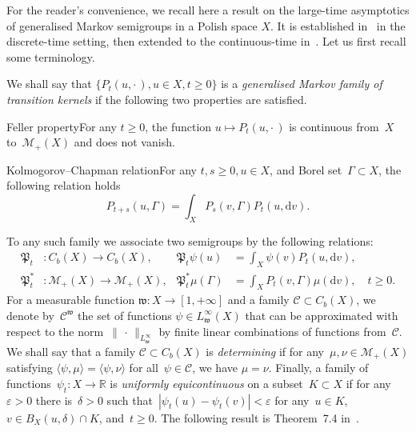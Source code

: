 \documentclass[AHL,Unicode,longabstracts]{cedram}
\newcommand{\R}{{\mathbb R}}
\newcommand{\CC}{{\mathcal C}}
\newcommand{\MM}{{\mathcal M}}
\newcommand{\wwww}{{\mathfrak w}}
\newcommand{\PPPP}{{\mathfrak P}}
\newcommand{\lag}{\langle}
\newcommand{\rag}{\rangle}
\newcommand{\dd}{\mathrm{d}}
\begin{document}
For the reader's convenience, we recall here a result on the large-time asymptotics of generalised Markov semigroups in a Polish space $X$. It is established in~\cite{JNPS-2014} in the discrete-time setting, then extended to the continuous-time in~\cite{MN-2015}. Let us first recall some terminology.

\begin{defi}\label{D:5.2}
We shall say that $\{P_t(u,{\cdot\,}),u\in X, t\ge0\} $ is a \emph{generalised Markov family of transition kernels} if the following two properties are satisfied.

Feller property\pointir For any $t\ge0$, the function $u\mapsto P_t(u,{\cdot\,})$ is continuous from~$X$ to~$\MM_+(X)$ and does not vanish.

Kolmogorov--Chapman relation\pointir For any $t,s\ge0, u\in X$, and Borel set~$\Gamma\subset X$, the following relation holds
\[
P_{t+s}(u,\Gamma)=\int_X P_s(v,\Gamma) P_t(u,\dd v).
\]
\end{defi}

To any such family we associate two semigroups by the following relations:
\begin{align*}
\PPPP_t&:C_b(X)\to C_b(X), & \PPPP_t \psi(u)&=\int_X \psi(v) P_t(u,\dd v),\\
\PPPP_t^*&:\MM_+(X)\to \MM_+(X), & \PPPP_t^* \mu(\Gamma)&=\int_X P_t(v,\Gamma) \mu(\dd v),\quad t\ge0.
\end{align*}
For a measurable function ${\wwww}:X\to[1,+\infty]$ and a family $\CC\subset C_b(X)$, we denote by~$\CC^\wwww$ the set of functions $\psi\in L_\wwww^\infty(X)$ that can be approximated with respect to the norm~$\|{\,\cdot\,}\|_{L_\wwww^\infty}$ by finite linear combinations of functions from~$\CC$. We shall say that a family $\CC\subset C_b(X)$ is \emph{determining} if for any~$\mu,\nu\in\MM_+(X)$ satisfying $\lag \psi,\mu\rag=\lag \psi,\nu\rag$ for all~$\psi\in\CC$, we have $\mu=\nu$. Finally, a family of functions~$\psi_t: X\to\R$ is \emph{uniformly equicontinuous} on a subset~$K\subset X$ if for any~$\varepsilon>0$ there is~$\delta>0$ such that~$|\psi_t(u)-\psi_t(v)|<\varepsilon$ for any~$u\in K$, $v\in B_X(u,\delta)\cap K$, and~$ t\ge0$. The following result is Theorem~7.4 in~\cite{MN-2015}.
\end{document}
